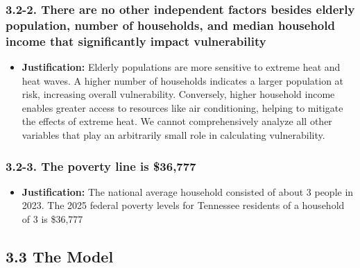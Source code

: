 \documentclass{article}
\begin{document}
\subsubsection*{3.2-2. There are no other independent factors besides elderly population, number of households, and median household income that significantly impact vulnerability}
\begin{itemize}
    \item \textbf{Justification:} 
    Elderly populations are more sensitive to extreme heat and heat waves\textsuperscript{\cite{cdc_heat}}. A higher number of households indicates a larger population at risk, increasing overall vulnerability. Conversely, higher household income enables greater access to resources like air conditioning, helping to mitigate the effects of extreme heat.
    We cannot comprehensively analyze all other variables that play an arbitrarily small role in calculating vulnerability. 
\end{itemize}

\subsubsection*{3.2-3. The poverty line is \$36,777}
\begin{itemize}
    \item \textbf{Justification:} The national average household consisted of about 3 people in 2023\textsuperscript{\cite{statista_household}}.
    The 2025 federal poverty levels for Tennessee residents of a household of 3 is \$36,777\textsuperscript{\cite{tn_fpl}}
\end{itemize}

\subsection*{3.3 The Model}
\end{document}
